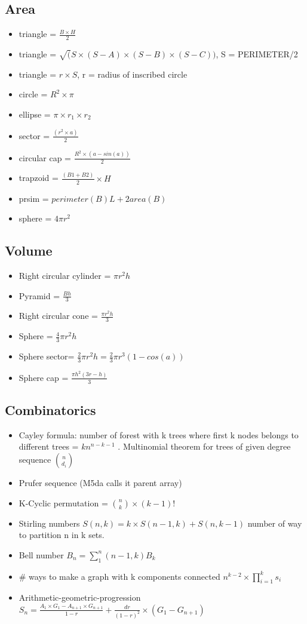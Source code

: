 \subsection{Area}
\begin{itemize}
\item triangle = $\frac{B \times H}{2}$
\item triangle = $\sqrt(S \times (S-A) \times (S-B) \times (S-C))$, S = PERIMETER/2
\item triangle = $r \times S$, r = radius of inscribed circle
\item circle = $R^2 \times \pi$
\item ellipse = $\pi \times r_1 \times r_2$
\item sector = $\frac{(r^2 \times a)}{2}$
\item circular cap = $\frac{R^2 \times (a-sin(a))}{2}$
\item trapzoid = $\frac{(B1 + B2)}{2} \times H$
\item prsim = $perimeter(B) L + 2 area(B)$
\item sphere = $4 \pi r^2$
\end{itemize}
\hrulefill
\subsection{Volume}
\begin{itemize}
\item Right circular cylinder = $\pi r^2 h$ 
\item Pyramid = $\frac{Bh}{3}$
\item Right circular cone = $\frac{\pi r^2 h}{3}$
\item Sphere = $\frac{4}{3} \pi r^2 h$
\item Sphere sector= $\frac{2}{3} \pi r^2h = \frac{2}{3} \pi r^3 (1-cos(a))$
\item Sphere cap = $\frac{\pi h^2 (3r-h)}{3}$
\end{itemize}
\hrulefill
\subsection{Combinatorics}
\begin{itemize}
\item Cayley formula: number of forest with k trees where first k nodes belongs to different trees = $k n^{n-k-1}$ . Multinomial theorem for trees of given degree sequence ${\binom{n}{d_i}}$
\item Prufer sequence (M5da calls it parent array)
\item  K-Cyclic permutation = ${\binom{n}{k}} \times (k-1)!$
\item Stirling numbers $S(n,k) = k \times S(n-1,k) + S(n,k-1)$ number of way to partition n in k sets.
\item Bell number $B_n = \sum_1^n (n-1, k) B_k$ 
\item \# ways to make a graph with k components connected $n^{k-2} \times \prod_{i=1}^k s_i$
\item Arithmetic-geometric-progression $S_n = \frac{A_1 \times G_1 - A_{n+1} \times G_{n+1}}{1-r} + \frac{dr}{(1-r)^2} \times (G_1-G_{n+1})$
\end{itemize}
\hrulefill
